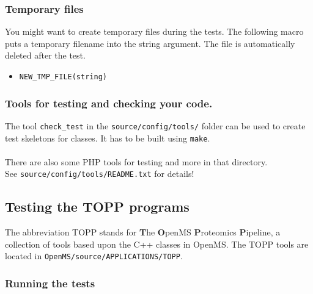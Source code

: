 \documentclass[a4]{article}
\begin{document}
\subsubsection{Temporary files}
You might want to create temporary files during the tests. The following macro 
puts a temporary filename into the string argument. The file is automatically deleted
after the test.
\begin{itemize}
        \item {\tt NEW\_TMP\_FILE(string)}
\end{itemize}

\subsubsection{Tools for testing and checking your code.}
The tool {\tt check\_test} in the {\tt source/config/tools/} folder can be used to
create test skeletons for classes. It has to be built using {\tt make}.\\
\\
There are also some PHP tools for testing and more in that directory.\\
See {\tt source/config/tools/README.txt} for details!

\subsection{Testing the TOPP programs}

The abbreviation TOPP stands for \textbf{T}he \textbf{O}penMS
\textbf{P}roteomics \textbf{P}ipeline, a collection of tools based upon the
C++ classes in OpenMS.  The TOPP tools are located in \texttt{OpenMS/source/APPLICATIONS/TOPP}.

\subsubsection{Running the tests}
\end{document}

